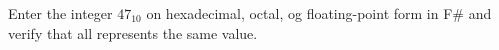 Enter the integer $47_{10}$ on hexadecimal, octal, og floating-point form in F\# and verify that all represents the same value.